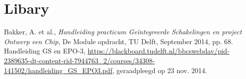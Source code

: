 \documentclass[11pt,twoside,a4paper]{article}
\begin{document}
\section{Libary}
\begin{thebibliography}{9}
Bakker, A. et al., 
\emph{Handleiding practicum Ge\"integreerde Schakelingen en project Ontwerp een Chip},
De Module opdracht,
TU Delft, 
September 2014,
pp. 68.
Handleiding GS en EPO-3, 
\url{https://blackboard.tudelft.nl/bbcswebdav/pid-2389635-dt-content-rid-7944763_2/courses/34308-141502/handleiding_GS_EPO3.pdf}, 
geraadpleegd op 23 nov. 2014.
\end{thebibliography}
\end{document}

